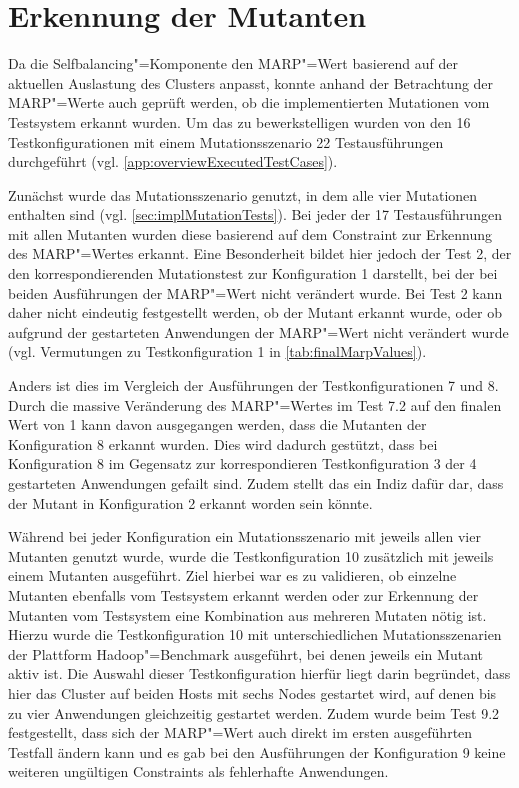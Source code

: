 \section{Erkennung der Mutanten}
\label{sec:killingMutants}

Da die Selfbalancing"=Komponente den \ac{MARP}"=Wert basierend auf der aktuellen Auslastung des Clusters anpasst, konnte anhand der Betrachtung der \ac{MARP}"=Werte auch geprüft werden, ob die implementierten Mutationen vom Testsystem erkannt wurden.
Um das zu bewerkstelligen wurden von den 16 Testkonfigurationen mit einem Mutationsszenario 22 Testausführungen durchgeführt (vgl. \autoref{app:overviewExecutedTestCases}).

Zunächst wurde das Mutationsszenario genutzt, in dem alle vier Mutationen enthalten sind (vgl. \autoref{sec:implMutationTests}).
Bei jeder der 17 Testausführungen mit allen Mutanten wurden diese basierend auf dem Constraint zur Erkennung des \ac{MARP}"=Wertes erkannt.
Eine Besonderheit bildet hier jedoch der Test 2, der den korrespondierenden Mutationstest zur Konfiguration 1 darstellt, bei der bei beiden Ausführungen der \ac{MARP}"=Wert nicht verändert wurde.
Bei Test 2 kann daher nicht eindeutig festgestellt werden, ob der Mutant erkannt wurde, oder ob aufgrund der gestarteten Anwendungen der \ac{MARP}"=Wert nicht verändert wurde (vgl. Vermutungen zu Testkonfiguration 1 in \autoref{tab:finalMarpValues}).

Anders ist dies im Vergleich der Ausführungen der Testkonfigurationen 7 und 8.
Durch die massive Veränderung des \ac{MARP}"=Wertes im Test 7.2 auf den finalen Wert von 1 kann davon ausgegangen werden, dass die Mutanten der Konfiguration 8 erkannt wurden.
Dies wird dadurch gestützt, dass bei Konfiguration 8 im Gegensatz zur korrespondieren Testkonfiguration 3 der 4 gestarteten Anwendungen gefailt sind.
Zudem stellt das ein Indiz dafür dar, dass der Mutant in Konfiguration 2 erkannt worden sein könnte.

Während bei jeder Konfiguration ein Mutationsszenario mit jeweils allen vier Mutanten genutzt wurde, wurde die Testkonfiguration 10 zusätzlich mit jeweils einem Mutanten ausgeführt.
Ziel hierbei war es zu validieren, ob einzelne Mutanten ebenfalls vom Testsystem erkannt werden oder zur Erkennung der Mutanten vom Testsystem eine Kombination aus mehreren Mutaten nötig ist.
Hierzu wurde die Testkonfiguration 10 mit unterschiedlichen Mutationsszenarien der Plattform Hadoop"=Benchmark ausgeführt, bei denen jeweils ein Mutant aktiv ist.
Die Auswahl dieser Testkonfiguration hierfür liegt darin begründet, dass hier das Cluster auf beiden Hosts mit sechs Nodes gestartet wird, auf denen bis zu vier Anwendungen gleichzeitig gestartet werden.
Zudem wurde beim Test 9.2 festgestellt, dass sich der \ac{MARP}"=Wert auch direkt im ersten ausgeführten Testfall ändern kann und es gab bei den Ausführungen der Konfiguration 9 keine weiteren ungültigen Constraints als fehlerhafte Anwendungen.

